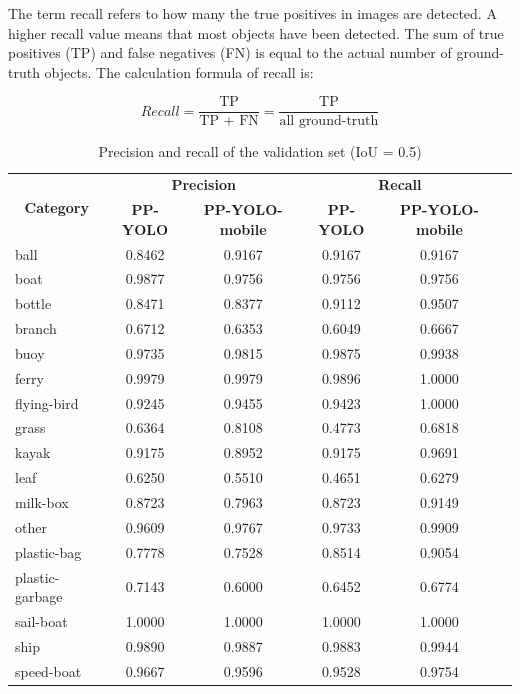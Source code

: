 \documentclass[sensors,article,submit,moreauthors,pdftex]{Definitions/mdpi}
\begin{document}
The term recall refers to how many the true positives in images are detected. A higher recall value means that most objects have been detected. The sum of true positives (TP) and false negatives (FN) is equal to the actual number of ground-truth objects. The calculation formula of recall is:

\begin{equation} 
Recall = \frac{\text{TP}}{\text{TP + FN} } = \frac{\text{TP}}{\text{all\ ground-truth} } 
\end{equation}

\begin{table}[htbp]
\centering
\caption{Precision and recall of the validation set (IoU = 0.5)}
\begin{tabular}{lccccc} 
\toprule

\multicolumn{1}{c}{\multirow{2}{*}{\textbf{Category}}} & \multicolumn{2}{c}{\textbf{Precision}}       & \multicolumn{2}{c}{\textbf{Recall}} \\
\cmidrule(l){2-5} 
\multicolumn{1}{c}{} & \textbf{PP-YOLO} & \textbf{PP-YOLO-mobile} & \textbf{PP-YOLO} & \textbf{PP-YOLO-mobile} \\

\midrule
ball& 0.8462& 0.9167& 0.9167& 0.9167 \\
boat& 0.9877& 0.9756& 0.9756& 0.9756 \\
bottle& 0.8471& 0.8377& 0.9112& 0.9507 \\
branch& 0.6712& 0.6353& 0.6049& 0.6667 \\
buoy& 0.9735& 0.9815& 0.9875& 0.9938 \\
ferry& 0.9979& 0.9979& 0.9896& 1.0000 \\
flying-bird& 0.9245&0.9455 & 0.9423& 1.0000 \\
grass& 0.6364& 0.8108& 0.4773& 0.6818 \\
kayak& 0.9175& 0.8952& 0.9175& 0.9691 \\
leaf& 0.6250& 0.5510& 0.4651& 0.6279 \\
milk-box& 0.8723& 0.7963& 0.8723& 0.9149 \\
other& 0.9609& 0.9767& 0.9733& 0.9909 \\
plastic-bag& 0.7778& 0.7528& 0.8514& 0.9054 \\
plastic-garbage& 0.7143&0.6000 & 0.6452& 0.6774 \\
sail-boat& 1.0000& 1.0000& 1.0000& 1.0000 \\
ship& 0.9890& 0.9887& 0.9883& 0.9944 \\
speed-boat& 0.9667& 0.9596& 0.9528& 0.9754 \\

\bottomrule
\end{tabular}
\label{tbl:precision}
\end{table}
\end{document}
